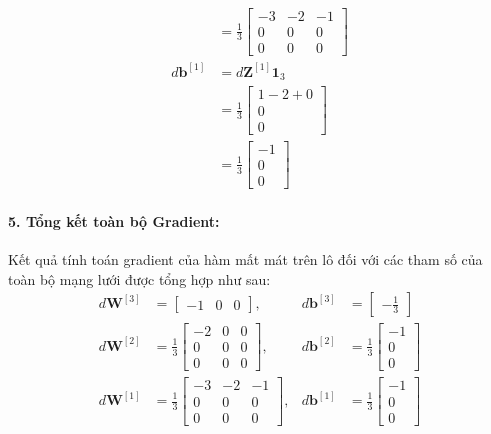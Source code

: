 \begin{itemize}
\begin{align*}
    &= \frac{1}{3}\begin{bmatrix} -3 & -2 & -1 \\ 0 & 0 & 0 \\ 0 & 0 & 0 \end{bmatrix} \\
    d\mathbf{b}^{[1]} &= d\mathbf{Z}^{[1]}\mathbf{1}_3 \\
    &= \frac{1}{3}\begin{bmatrix} 1 - 2 + 0 \\ 0 \\ 0 \end{bmatrix} \\
    &= \frac{1}{3}\begin{bmatrix} -1 \\ 0 \\ 0 \end{bmatrix}
    \end{align*}
\end{itemize}

\paragraph{5. Tổng kết toàn bộ Gradient:}
Kết quả tính toán gradient của hàm mất mát trên lô đối với các tham số của toàn bộ mạng lưới được tổng hợp như sau:
\begin{align*}
d\mathbf{W}^{[3]} &= \begin{bmatrix} -1 & 0 & 0 \end{bmatrix}, & d\mathbf{b}^{[3]} &= \begin{bmatrix} -\frac{1}{3} \end{bmatrix} \\
d\mathbf{W}^{[2]} &= \frac{1}{3}\begin{bmatrix} -2 & 0 & 0 \\ 0 & 0 & 0 \\ 0 & 0 & 0 \end{bmatrix}, & d\mathbf{b}^{[2]} &= \frac{1}{3}\begin{bmatrix} -1 \\ 0 \\ 0 \end{bmatrix} \\
d\mathbf{W}^{[1]} &= \frac{1}{3}\begin{bmatrix} -3 & -2 & -1 \\ 0 & 0 & 0 \\ 0 & 0 & 0 \end{bmatrix}, & d\mathbf{b}^{[1]} &= \frac{1}{3}\begin{bmatrix} -1 \\ 0 \\ 0 \end{bmatrix}
\end{align*}

